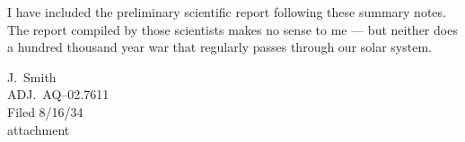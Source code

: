 \documentclass[letterpaper,10pt]{texMemo} %
\newenvironment{absolutelynopagebreak}
  {\par\nobreak\vfil\penalty0\vfilneg
   \vtop\bgroup}
  {\par\xdef\tpd{\the\prevdepth}\egroup
   \prevdepth=\tpd}
\begin{document}
\noindent I have included the preliminary scientific report following these summary notes.  The report compiled by those scientists makes no sense to me --- but neither does a hundred thousand year war that regularly passes through our solar system.

\bigskip
\noindent J.~Smith \\
ADJ.~AQ--02.7611 \\
Filed 8/16/34 \\

\bigskip
\noindent attachment

\end{document}
